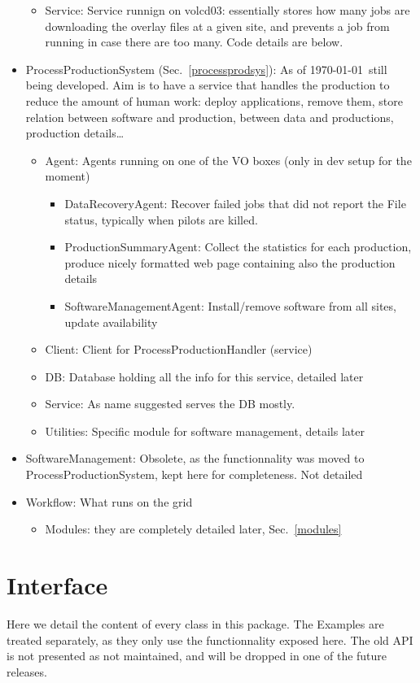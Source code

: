 \documentclass[a4paper,12pt]{article}
\begin{document}
\begin{itemize}
\begin{itemize}
    \item Service: Service runnign on volcd03: essentially stores how many jobs
    are downloading the overlay files at a given site, and prevents a job from
    running in case there are too many. Code details are below.
  \end{itemize}
  \item ProcessProductionSystem (Sec.~\ref{processprodsys}): As of \today\
  still being developed. Aim is to have a service that handles the production to reduce the amount of human work:
  deploy applications, remove them, store relation between software and
  production, between data and productions, production details\ldots
  \begin{itemize}
    \item Agent: Agents running on one of the VO boxes (only in dev setup for
    the moment)
    \begin{itemize}
      \item DataRecoveryAgent: Recover failed jobs that did not report the File
      status, typically when pilots are killed.
      \item ProductionSummaryAgent: Collect the statistics for each production,
      produce nicely formatted web page containing also the production details
      \item SoftwareManagementAgent: Install/remove software from all sites,
      update availability
    \end{itemize}
    \item Client: Client for ProcessProductionHandler (service)
    \item DB: Database holding all the info for this service, detailed later
    \item Service: As name suggested serves the DB mostly.
    \item Utilities: Specific module for software management, details later
  \end{itemize}
  \item SoftwareManagement: Obsolete, as the functionnality was moved to
  ProcessProductionSystem, kept here for completeness. Not detailed
  \item Workflow: What runs on the grid
  \begin{itemize}
    \item Modules: they are completely detailed later, Sec.~\ref{modules}
  \end{itemize}
\end{itemize}


\section{Interface}\label{interface}
Here we detail the content of every class in this package. The Examples are
treated separately, as they only use the functionnality exposed here. The old
API is not presented as not maintained, and will be dropped in one of the future
releases.
\end{document}
